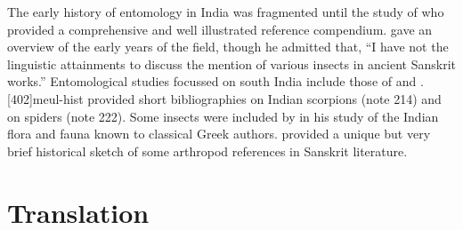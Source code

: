 The early history of entomology in India was fragmented until the
study of \citet{maxw-1909} who provided a comprehensive and well
illustrated reference compendium. \citet{dove-1922} gave an overview
of the early years of the field, though he admitted that, “I have not
the linguistic attainments to discuss the mention of various insects
in ancient Sanskrit works.”   Entomological studies focussed on south
India include those of \citet{bain-1914} and \citet{rama-1963}.
[402]{meul-hist} provided short bibliographies on Indian
scorpions (note 214) and on spiders (note 222). Some insects were
included by \citet{ball-1888} in his study of the Indian flora and fauna
known to classical Greek authors. \citet{kaur-2018} provided a unique
but very brief historical sketch of some arthropod references in
Sanskrit literature.

\newpage
\section{Translation}



